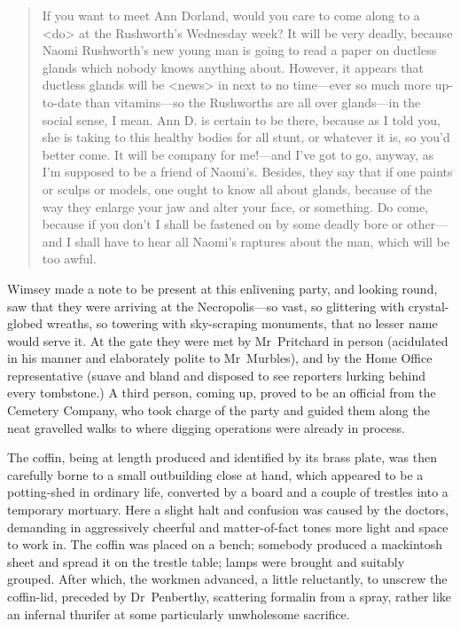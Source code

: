 \begin{quote}If you want to meet Ann Dorland, would you care to come along to a <do> at the Rushworth's Wednesday week? It will be very deadly, because Naomi Rushworth's new young man is going to read a paper on ductless glands which nobody knows anything about. However, it appears that ductless glands will be <news> in next to no time—ever so much more up-to-date than vitamins—so the Rushworths are all over glands—in the social sense, I mean. Ann D\@. is certain to be there, because as I told you, she is taking to this healthy bodies for all stunt, or whatever it is, so you'd better come. It will be company for me!—and I've got to go, anyway, as I'm supposed to be a friend of Naomi's. Besides, they say that if one paints or sculps or models, one ought to know all about glands, because of the way they enlarge your jaw and alter your face, or something. Do come, because if you don't I shall be fastened on by some deadly bore or other—and I shall have to hear all Naomi's raptures about the man, which will be too awful.
\end{quote}

Wimsey made a note to be present at this enlivening party, and looking round, saw that they were arriving at the Necropolis—so vast, so glittering with crystal-globed wreaths, so towering with sky-scraping monuments, that no lesser name would serve it. At the gate they were met by Mr~Pritchard in person (acidulated in his manner and elaborately polite to Mr~Murbles), and by the Home Office representative (suave and bland and disposed to see reporters lurking behind every tombstone.) A third person, coming up, proved to be an official from the Cemetery Company, who took charge of the party and guided them along the neat gravelled walks to where digging operations were already in process.

The coffin, being at length produced and identified by its brass plate, was then carefully borne to a small outbuilding close at hand, which appeared to be a potting-shed in ordinary life, converted by a board and a couple of trestles into a temporary mortuary. Here a slight halt and confusion was caused by the doctors, demanding in aggressively cheerful and matter-of-fact tones more light and space to work in. The coffin was placed on a bench; somebody produced a mackintosh sheet and spread it on the trestle table; lamps were brought and suitably grouped. After which, the workmen advanced, a little reluctantly, to unscrew the coffin-lid, preceded by Dr~Penberthy, scattering formalin from a spray, rather like an infernal thurifer at some particularly unwholesome sacrifice.

